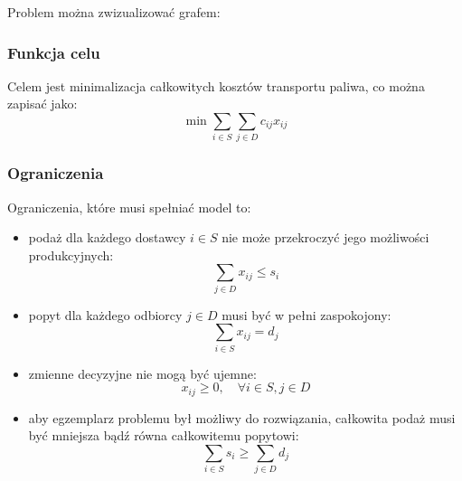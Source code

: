 \documentclass[11pt,a4paper]{article}
\newcommand{\nI}{3} %
\newcommand{\nJ}{4} %
\numberwithin{equation}{section}
\begin{document}
Problem można zwizualizować grafem:
\begin{center}\end{center}

\subsubsection{Funkcja celu}
Celem jest minimalizacja całkowitych kosztów transportu paliwa, co można zapisać jako:
\[
    \min \sum_{i \in S} \sum_{j \in D} c_{ij} x_{ij}
\]
\subsubsection{Ograniczenia}
Ograniczenia, które musi spełniać model to:
\begin{itemize}
    \item podaż dla każdego dostawcy $i \in S$ nie może przekroczyć jego możliwości produkcyjnych:
        \[
            \sum_{j \in D} x_{ij} \leq s_i
        \]
    \item popyt dla każdego odbiorcy $j \in D$ musi być w pełni zaspokojony:
        \[
            \sum_{i \in S} x_{ij} = d_j
        \]
    \item zmienne decyzyjne nie mogą być ujemne:
        \[
            x_{ij} \geq 0, \quad \forall i \in S, j \in D
        \]
    \item aby egzemplarz problemu był możliwy do rozwiązania, całkowita podaż musi być mniejsza bądź równa całkowitemu popytowi:
        \[
            \sum_{i \in S} s_i \geq \sum_{j \in D} d_j
        \]
\end{itemize}
\end{document}
